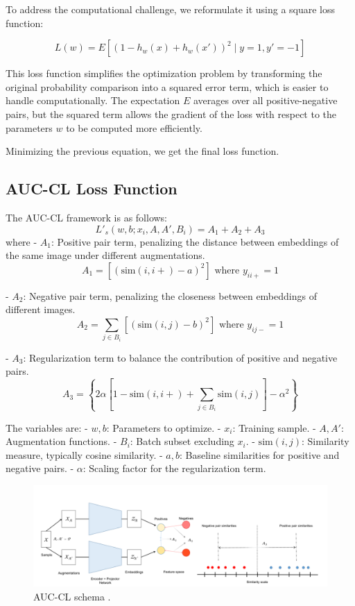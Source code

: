 To address the computational challenge, we reformulate it using a square loss function:

\[
L(w) = E\left[(1 - h_w(x) + h_w(x'))^2 \mid y = 1, y' = -1\right]
\]

This loss function simplifies the optimization problem by transforming the original probability comparison into a squared error term, which is easier to handle computationally. The expectation \( E \) averages over all positive-negative pairs, but the squared term allows the gradient of the loss with respect to the parameters \( w \) to be computed more efficiently. 

Minimizing the previous equation, we get the final loss function.

\subsection{AUC-CL Loss Function}
The AUC-CL framework is as follows:
\[
L'_s(w, b; x_i, A, A', B_i) = A_1 + A_2 + A_3
\]
where
- \(A_1\): Positive pair term, penalizing the distance between embeddings of the same image under different augmentations.
  \[
  A_1 = \left[ (\text{sim}(i, i+) - a)^2 \right] \text{ where } y_{ii+} = 1
  \]

- \(A_2\): Negative pair term, penalizing the closeness between embeddings of different images.
  \[
  A_2 = \sum_{j \in B_i} \left[ (\text{sim}(i, j) - b)^2 \right] \text{ where } y_{ij-} = 1
  \]

- \(A_3\): Regularization term to balance the contribution of positive and negative pairs.
  \[
  A_3 = \left\{ 2\alpha \left[ 1 - \text{sim}(i, i+) + \sum_{j \in B_i} \text{sim}(i, j) \right] - \alpha^2 \right\}
  \]

The variables are:
- \(w, b\): Parameters to optimize.
- \(x_i\): Training sample.
- \(A, A'\): Augmentation functions.
- \(B_i\): Batch subset excluding \(x_i\).
- \(\text{sim}(i, j)\): Similarity measure, typically cosine similarity.
- \(a, b\): Baseline similarities for positive and negative pairs.
- \(\alpha\): Scaling factor for the regularization term.


\begin{figure}[hbt]
\centering
\includegraphics[width=\textwidth]{figs/auc-cl.png}
\caption{
AUC-CL schema \cite{sharma2023auc}.
}
\label{fig:secex}
\end{figure}

